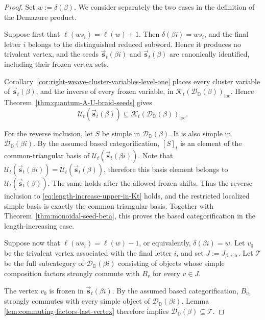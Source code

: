 \documentclass[12pt, reqno]{amsart}
\theoremstyle{plain}
\theoremstyle{definition}
\numberwithin{equation}{section}
\newcommand{\DD}{\mathbb{D}}
\begin{document}
\begin{proof}
Set \(w:=\delta(\beta)\). We consider separately the two cases in
the definition of the Demazure product.

Suppose first that \(\ell(ws_i)=\ell(w)+1\). Then
\(\delta(\beta i)=ws_i\), and the final letter \(i\) belongs to the
distinguished reduced subword. Hence it produces no trivalent
vertex, and the seeds
\(\overrightarrow{\mathbf s}_t(\beta i)\) and
\(\overrightarrow{\mathbf s}_t(\beta)\) are canonically identified,
including their frozen vertex sets.

Corollary~\ref{cor:right-weave-cluster-variables-level-one} places every
cluster variable of \(\overrightarrow{\mathbf s}_t(\beta)\), and the
inverse of every frozen variable, in
\(\mathcal{K}_t(\mathscr D_{\DD}(\beta))_{\mathrm{loc}}\). Hence
Theorem~\ref{thm:quantum-A-U-braid-seeds} gives
\begin{equation}\label{eq:length-increase-upper-in-Kt}
    \mathcal U_t(\overrightarrow{\mathbf s}_t(\beta))
    \subseteq
    \mathcal{K}_t(\mathscr D_{\DD}(\beta))_{\mathrm{loc}}.
\end{equation}

For the reverse inclusion, let \(S\) be simple in
\(\mathscr D_{\DD}(\beta)\). It is also simple in
\(\mathscr D_{\DD}(\beta i)\). By the assumed based categorification,
\([S]_t\) is an element of the common-triangular basis of \( \mathcal{U}_t(\overrightarrow{\mathbf{s}}_t(\beta i))\). Note that $\mathcal{U}_t(\overrightarrow{\mathbf{s}}_t(\beta i))=\mathcal{U}_t(\overrightarrow{\mathbf{s}}_t(\beta))$, therefore this basis element belongs to
\(\mathcal U_t(\overrightarrow{\mathbf s}_t(\beta))\). The same holds after
the allowed frozen shifts. Thus the reverse inclusion to
\eqref{eq:length-increase-upper-in-Kt} holds, and the restricted localized
simple basis is exactly the common triangular basis. Together with
Theorem~\ref{thm:monoidal-seed-beta}, this proves the based
categorification in the length-increasing case.

Suppose now that \(\ell(ws_i)=\ell(w)-1\), or equivalently,
\(\delta(\beta i)=w\). Let \(v_0\) be the trivalent vertex associated
with the final letter \(i\), and set
\(J:=J_{\beta,i,\mathrm{fr}}\). Let \(\mathscr T\) be the full
subcategory of \(\mathscr D_{\DD}(\beta i)\) consisting of objects
whose simple composition factors strongly commute with \(B_v\) for
every \(v\in J\).

The vertex \(v_0\) is frozen in
\(\overrightarrow{\mathbf s}_t(\beta i)\). By the assumed based
categorification, \(B_{v_0}\) strongly commutes with every simple
object of \(\mathscr D_{\DD}(\beta i)\). Lemma
\ref{lem:commuting-factors-last-vertex} therefore implies
\(\mathscr D_{\DD}(\beta)\subseteq\mathscr T\).


\end{proof}
\end{document}
